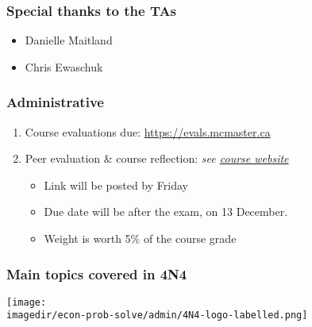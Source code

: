

\begin{frame}\frametitle{Special thanks to the TAs}
	\begin{itemize}
		\item	Danielle Maitland
		\item	Chris Ewaschuk
	\end{itemize}
\end{frame}

\begin{frame}\frametitle{Administrative}
	\begin{enumerate}
		\item	Course evaluations due: \href{https://evals.mcmaster.ca}{https://evals.mcmaster.ca}
		\item	Peer evaluation \& course reflection: \emph{see \href{https://docs.google.com/spreadsheet/viewform?formkey=dFE0M1J3NWstZjE5SE4tN19lRGxheGc6MQ}{course website}}
		\begin{itemize}
			\item	Link will be posted by Friday
			\item	Due date will be after the exam, on 13 December.
			\item	Weight is worth 5\% of the course grade
		\end{itemize}
	\end{enumerate}
\end{frame}

\begin{frame}\frametitle{Main topics covered in 4N4}
	\begin{center}
		\texttt{[image: \\imagedir/econ-prob-solve/admin/4N4-logo-labelled.png]}
	\end{center}
	\vspace{-12pt}
	{\small {\color{brown}{This is a unique course: not taught anywhere else.}}}
\end{frame}

